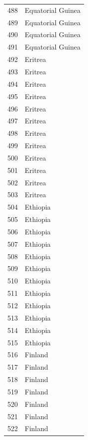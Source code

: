 \documentclass[
  letterpaper,
  DIV=11,
  numbers=noendperiod]{scrreprt}
\begin{document}
\begin{tabular}{ll}
488  &         Equatorial Guinea \\
489  &         Equatorial Guinea \\
490  &         Equatorial Guinea \\
491  &         Equatorial Guinea \\
492  &                   Eritrea \\
493  &                   Eritrea \\
494  &                   Eritrea \\
495  &                   Eritrea \\
496  &                   Eritrea \\
497  &                   Eritrea \\
498  &                   Eritrea \\
499  &                   Eritrea \\
500  &                   Eritrea \\
501  &                   Eritrea \\
502  &                   Eritrea \\
503  &                   Eritrea \\
504  &                  Ethiopia \\
505  &                  Ethiopia \\
506  &                  Ethiopia \\
507  &                  Ethiopia \\
508  &                  Ethiopia \\
509  &                  Ethiopia \\
510  &                  Ethiopia \\
511  &                  Ethiopia \\
512  &                  Ethiopia \\
513  &                  Ethiopia \\
514  &                  Ethiopia \\
515  &                  Ethiopia \\
516  &                   Finland \\
517  &                   Finland \\
518  &                   Finland \\
519  &                   Finland \\
520  &                   Finland \\
521  &                   Finland \\
522  &                   Finland \\

\end{tabular}
\end{document}
